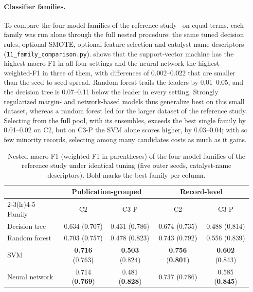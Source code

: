 \documentclass[10pt,a4paper]{article}
\begin{document}
\paragraph{Classifier families.} To compare the four model families of the
reference study~\cite{li2025hmf} on equal terms, each family was run alone
through the full nested procedure: the same tuned decision rules, optional
SMOTE, optional feature selection and catalyst-name descriptors
(\texttt{11\_family\_comparison.py}).  shows that the
support-vector machine has the highest macro-F1 in all four settings and the
neural network the highest weighted-F1 in three of them, with differences of
0.002--0.022 that are smaller than the seed-to-seed spread. Random forest
trails the leaders by 0.01--0.05, and the decision tree is 0.07--0.11 below the
leader in every setting. Strongly regularized margin- and network-based models
thus generalize best on this small dataset, whereas a random forest led for
the larger dataset of the reference study. Selecting from the full pool, with
its ensembles, exceeds the best single family by 0.01--0.02 on C2, but on C3-P
the SVM alone scores higher, by 0.03--0.04; with so few minority records,
selecting among many candidates costs as much as it gains.

\begin{table}[t]
\centering
\caption{Nested macro-F1 (weighted-F1 in parentheses) of the four model families
of the reference study under identical tuning (five outer seeds, catalyst-name
descriptors). Bold marks the best family per column.}
\label{tab:families}
\small
\setlength{\tabcolsep}{3.5pt}
\begin{tabular}{lcccc}
\toprule
& \multicolumn{2}{c}{Publication-grouped} & \multicolumn{2}{c}{Record-level} \\
\cmidrule(lr){2-3}\cmidrule(lr){4-5}
Family & C2 & C3-P & C2 & C3-P \\
\midrule
Decision tree  & 0.634 (0.707) & 0.431 (0.786) & 0.674 (0.735) & 0.488 (0.814) \\
Random forest  & 0.703 (0.757) & 0.478 (0.823) & 0.743 (0.792) & 0.556 (0.839) \\
SVM            & \textbf{0.716} (0.763) & \textbf{0.503} (0.824) & \textbf{0.756} (\textbf{0.801}) & \textbf{0.602} (0.843) \\
Neural network & 0.714 (\textbf{0.769}) & 0.481 (\textbf{0.828}) & 0.737 (0.786) & 0.585 (\textbf{0.845}) \\
\bottomrule
\end{tabular}
\end{table}
\end{document}
